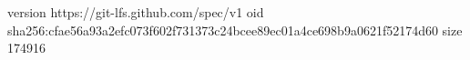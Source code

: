 version https://git-lfs.github.com/spec/v1
oid sha256:cfae56a93a2efc073f602f731373c24bcee89ec01a4ce698b9a0621f52174d60
size 174916
